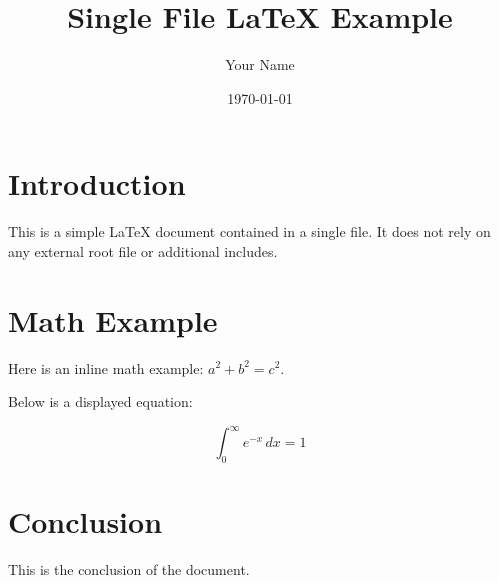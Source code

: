 \documentclass{article} %
\title{Single File LaTeX Example}
\author{Your Name}
\date{\today}
\begin{document}

\maketitle %

\section{Introduction}
This is a simple LaTeX document contained in a single file.
It does not rely on any external root file or additional includes.

\section{Math Example}
Here is an inline math example: \( a^2 + b^2 = c^2 \).

Below is a displayed equation:

\[
\int_0^\infty e^{-x} \, dx = 1
\]

\section{Conclusion}
This is the conclusion of the document.
\end{document}
